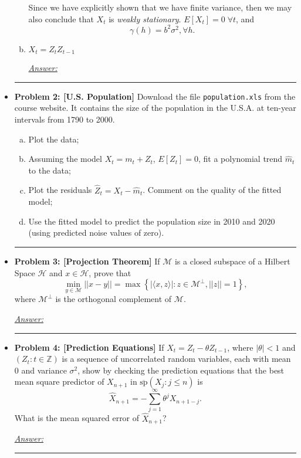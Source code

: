 \documentclass[a4paper, 11pt]{article}
\begin{document}
\begin{itemize}
\begin{enumerate}[(a)]
Since we have explicitly shown that we have finite variance, then we may also conclude that $X_t$ is \emph{weakly stationary}. $E[X_t] = 0 \; \forall t$, and 
$$\gamma(h) = b^2\sigma^2, \forall h. $$

		\item $X_t = Z_tZ_{t-1}$ \newline 
		
			\underline{\emph{Answer:}} \\ 

	\end{enumerate}
	
	
	\hrule 
	\item \textbf{Problem 2: [U.S. Population]} Download the file \texttt{population.xls} from the course website. It contains the size of the population in the U.S.A. at ten-year intervals from 1790 to 2000. 
	
	
	\begin{enumerate}[(a)]
		\item Plot the data; 
		\item Assuming the model $X_t = m_t + Z_t$, $E[Z_t] = 0$, fit a polynomial trend $\widehat{m}_t$ to the data; 
		\item Plot the residuals $\hat{Z}_t = X_t - \hat{m}_t$. Comment on the quality of the fitted model; 
		\item Use the fitted model to predict the population size in 2010 and 2020 (using predicted noise values of zero). 
	\end{enumerate}
	

	\hrule 
	\item \textbf{Problem 3: [Projection Theorem]} If $\mathcal{M}$ is a closed subspace of a Hilbert Space $\mathcal{H}$ and $x\in\mathcal{H}$, prove that 
	$$\underset{y\in\mathcal{M}}{\min}||x-y|| = \max\left\{|\langle x,z\rangle|: z\in \mathcal{M}^\bot, ||z|| = 1  \right\} ,$$
where $\mathcal{M}^\bot$ is the orthogonal complement of $\mathcal{M}$. \newline 

	\underline{\emph{Answer:}} \newline 
	
	\hrule 
	\item \textbf{Problem 4: [Prediction Equations]} If $X_t = Z_t - \theta Z_{t-1}$, where $|\theta| <1$ and $(Z_t: t\in\mathbb{Z})$ is a sequence of uncorrelated random variables, each with mean 0 and variance $\sigma^2$, show by checking the prediction equations that the best mean square predictor of $X_{n+1}$ in $\overline{\text{sp}}(X_j: j \leq n)$ is 
	$$\hat{X}_{n+1} = -\sum_{j=1}^\infty \theta^j X_{n+1-j}. $$
	What is the mean squared error of $\hat{X}_{n+1}$?

	\underline{\emph{Answer:}} \newline 
	
	\hrule 


\end{itemize}	
\end{document}

